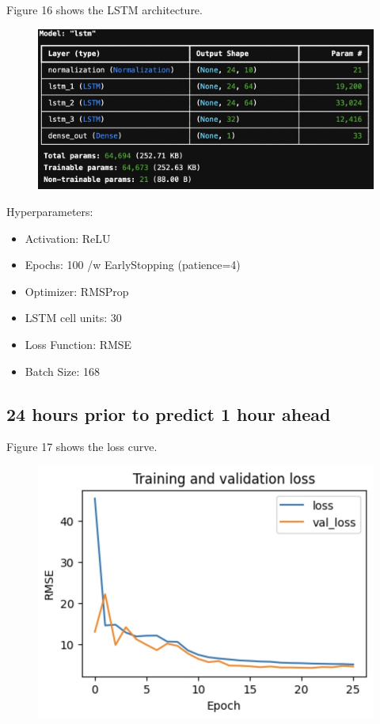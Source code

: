 \documentclass[9pt,a4paper,twoside]{rho}
\begin{document}
\noindent Figure 16 shows the LSTM architecture.
\begin{figure}[H]
	\centering
	\includegraphics[width=0.8\columnwidth]{Figures/LSTM_Architecture.png}
\end{figure}

\noindent Hyperparameters:
\begin{itemize}
	\item Activation: ReLU
	\item Epochs: 100 /w EarlyStopping (patience=4)
	\item Optimizer: RMSProp
	\item LSTM cell units: 30
	\item Loss Function: RMSE
	\item Batch Size: 168
\end{itemize}

\subsection*{24 hours prior to predict 1 hour ahead}

\noindent Figure 17 shows the loss curve.
\begin{figure}[H]
	\centering
	\includegraphics[width=0.8\columnwidth]{Figures/LSTM_24_1_Learning.png}
\end{figure}
\end{document}
